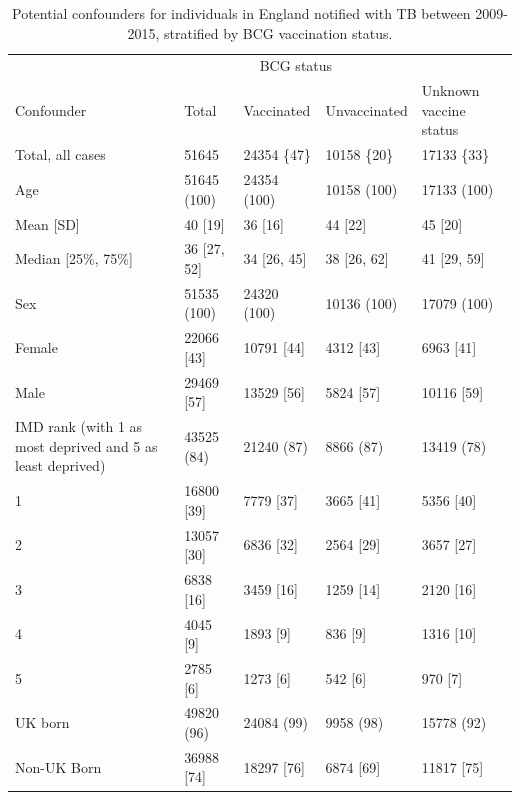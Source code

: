\documentclass[11pt,twoside]{bristolthesis}
\begin{document}
  \begin{table}[H]
  
  \caption{\label{tab:06-demo-sum}Potential confounders for individuals in England notified with TB between 2009-2015,  stratified by BCG vaccination status.}
  \centering
  \fontsize{8}{10}\selectfont
  \begin{tabular}{>{\raggedright\arraybackslash}p{3cm}llll}
  \toprule
  \multicolumn{2}{c}{ } & \multicolumn{3}{c}{BCG status} \\
  \cmidrule(l{3pt}r{3pt}){3-5}
  Confounder & Total & Vaccinated & Unvaccinated & Unknown vaccine status\\
  \midrule
  Total, all cases & 51645 & 24354 \{47\} & 10158 \{20\} & 17133 \{33\}\\
  Age & 51645 (100) & 24354 (100) & 10158 (100) & 17133 (100)\\
  Mean [SD] & 40 [19] & 36 [16] & 44 [22] & 45 [20]\\
  Median [25\%, 75\%] & 36 [27, 52] & 34 [26, 45] & 38 [26, 62] & 41 [29, 59]\\
  Sex & 51535 (100) & 24320 (100) & 10136 (100) & 17079 (100)\\
  \addlinespace
  \hspace{1em}Female & 22066 [43] & 10791 [44] & 4312 [43] & 6963 [41]\\
  \hspace{1em}Male & 29469 [57] & 13529 [56] & 5824 [57] & 10116 [59]\\
  IMD rank (with 1 as most deprived and 5 as least deprived) & 43525 (84) & 21240 (87) & 8866 (87) & 13419 (78)\\
  \hspace{1em}1 & 16800 [39] & 7779 [37] & 3665 [41] & 5356 [40]\\
  \hspace{1em}2 & 13057 [30] & 6836 [32] & 2564 [29] & 3657 [27]\\
  \addlinespace
  \hspace{1em}3 & 6838 [16] & 3459 [16] & 1259 [14] & 2120 [16]\\
  \hspace{1em}4 & 4045 [9] & 1893 [9] & 836 [9] & 1316 [10]\\
  \hspace{1em}5 & 2785 [6] & 1273 [6] & 542 [6] & 970 [7]\\
  UK born & 49820 (96) & 24084 (99) & 9958 (98) & 15778 (92)\\
  \hspace{1em}Non-UK Born & 36988 [74] & 18297 [76] & 6874 [69] & 11817 [75]\\

\end{tabular}
\end{table}
\end{document}

